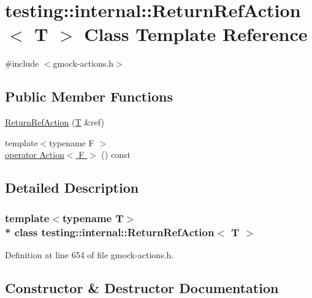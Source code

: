 \hypertarget{classtesting_1_1internal_1_1_return_ref_action}{}\section{testing\+:\+:internal\+:\+:Return\+Ref\+Action$<$ T $>$ Class Template Reference}
\label{classtesting_1_1internal_1_1_return_ref_action}


{\ttfamily \#include $<$gmock-\/actions.\+h$>$}

\subsection*{Public Member Functions}
\begin{DoxyCompactItemize}
\item 
\hyperlink{classtesting_1_1internal_1_1_return_ref_action_a1384b1cd78f3069f0493e2302f143701}{Return\+Ref\+Action} (\hyperlink{functions__7_8js_adf1f3edb9115acb0a1e04209b7a9937b}{T} \&ref)
\item 
{\footnotesize template$<$typename F $>$ }\\\hyperlink{classtesting_1_1internal_1_1_return_ref_action_a7b0df67b47a9e973fd80f7e2f90ba1bc}{operator Action$<$ F $>$} () const 
\end{DoxyCompactItemize}


\subsection{Detailed Description}
\subsubsection*{template$<$typename T$>$\\*
class testing\+::internal\+::\+Return\+Ref\+Action$<$ T $>$}



Definition at line 654 of file gmock-\/actions.\+h.



\subsection{Constructor \& Destructor Documentation}
